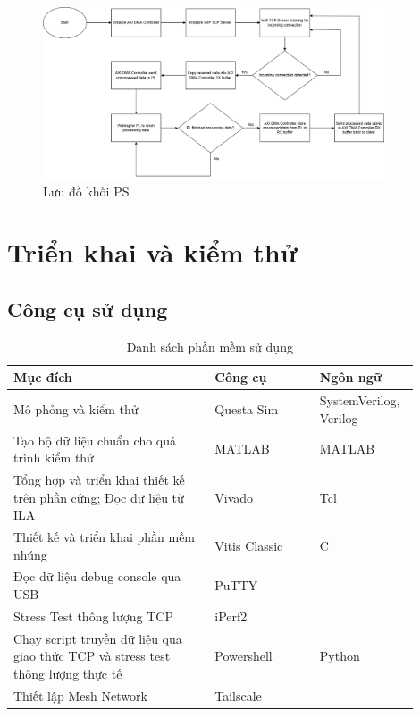 \documentclass[../DoAn.tex]{subfiles}
\begin{document}
\begin{figure}[H]
    \centering
    \includegraphics[width=0.9\textwidth, height=0.5\textheight, keepaspectratio]{Hinhve/Chuong 4/PS flow chart.png}
    \caption{Lưu đồ khối PS}
    \label{fig:Lưu đồ khối PS}
\end{figure}


\section{Triển khai và kiểm thử}

\subsection{Công cụ sử dụng}

\begin{table}[H]
\centering{}
    \caption{Danh sách phần mềm sử dụng}
    \begin{tabular}{|p{0.46\linewidth}|p{0.24\linewidth}|p{0.2\linewidth}|}
        \hline
        \textbf{Mục đích} & \textbf{Công cụ}  & \textbf{Ngôn ngữ} \\ \hline\hline
        Mô phỏng và kiểm thử  & Questa Sim   & SystemVerilog, Verilog           \\ \hline
        Tạo bộ dữ liệu chuẩn cho quá trình kiểm thử & MATLAB   & MATLAB          \\ \hline
        Tổng hợp và triển khai thiết kế trên phần cứng; Đọc dữ liệu từ ILA   & Vivado   & Tcl          \\ \hline
        Thiết kế và triển khai phần mềm nhúng  & Vitis Classic   & C          \\ \hline
        Đọc dữ liệu debug console qua USB  & PuTTY   &            \\ \hline
        Stress Test thông lượng TCP  & iPerf2   &            \\ \hline
        Chạy script truyền dữ liệu qua giao thức TCP và stress test thông lượng thực tế  & Powershell   & Python           \\ \hline
         Thiết lập Mesh Network  & Tailscale   &           \\ \hline
        \end{tabular}
\end{table}
\end{document}
